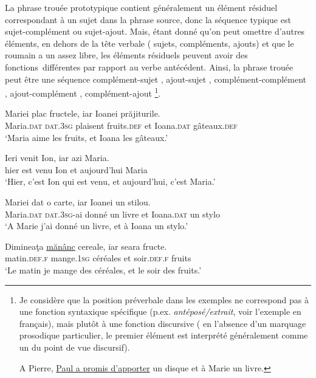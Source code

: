 \z
\z

La phrase trouée prototypique contient généralement un élément résiduel correspondant à un sujet dans la phrase source, donc la séquence typique est sujet-complément ou sujet-ajout. Mais, étant donné qu’on peut omettre d’autres éléments, en dehors de la tête verbale ({\cad} sujets, compléments, ajouts) et que le roumain a un  assez libre, les éléments résiduels peuvent avoir des fonctions~différentes par rapport au verbe antécédent. Ainsi, la phrase trouée peut être une séquence complément-sujet , ajout-sujet , complément-complément , ajout-complément , complément-ajout \footnote{
 Je considère que la position préverbale dans les exemples  ne correspond pas à une fonction syntaxique spécifique (p.ex. \textit{antéposé/extrait}, voir l’exemple  en français), mais plutôt à une fonction discursive ({\cad} en l’absence d’un marquage prosodique particulier, le premier élément est interprété généralement comme un  du point de vue discursif). 
 
 \ea \label{ch2:foot38exi}
 A Pierre, \uline{Paul a promis d’apporter} un disque et à Marie un livre.
 \z

}. 

\ea \label{ch2:ex115}
\ea 
\gll Mariei    plac  fructele,  iar  Ioanei  prăjiturile. \label{ch2:ex115a}\\
Maria.\textsc{dat} \textsc{dat.3sg}  plaisent  fruits.\textsc{def}  et  Ioana.\textsc{dat}  gâteaux.\textsc{def}\\
\glt  ‘Maria aime les fruits, et Ioana les gâteaux.’

\ex  
\gll Ieri    venit  Ion,  iar  azi  Maria. \label{ch2:ex115b}\\
hier  est  venu  Ion  et  aujourd’hui  Maria\\
\glt  ‘Hier, c’est Ion qui est venu, et aujourd’hui, c’est Maria.’   

\ex  
\gll Mariei    dat  o  carte,  iar  Ioanei  un  stilou. \label{ch2:ex115c}\\
Maria.\textsc{dat} \textsc{dat.3sg}{}-ai  donné  un  livre  et  Ioana.\textsc{dat}  un  stylo\\
\glt  ‘A Marie j’ai donné un livre, et à Ioana un stylo.’

\ex  
\gll Dimineaţa  \uline{mănânc}  cereale,  iar  seara  fructe. \label{ch2:ex115d}\\
matin.\textsc{def.f}  mange.\textsc{1sg}  céréales  et  soir.\textsc{def.f}  fruits\\
\glt  ‘Le matin je mange des céréales, et le soir des fruits.’   

